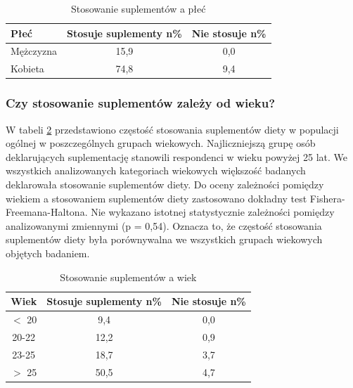 \begin{table}[H]
    \centering
    \caption{Stosowanie suplementów a płeć}
    \label{tab:supl-plec}
    \begin{tabular}{|l|c|c|}
        \hline
        \textbf{Płeć} & \textbf{Stosuje suplementy n\%} & \textbf{Nie stosuje n\%} \\
        \hline
        \hline
        Mężczyzna & 15,9 & 0,0 \\
        \hline
        Kobieta & 74,8 & 9,4 \\
        \hline
    \end{tabular}
\end{table}


\subsubsection{Czy stosowanie suplementów zależy od wieku?}

%
%

W tabeli \ref{tab:supl-wiek} przedstawiono częstość stosowania suplementów diety w populacji ogólnej w poszczególnych grupach wiekowych. Najliczniejszą grupę osób deklarujących suplementację stanowili respondenci w wieku powyżej 25 lat. We wszystkich analizowanych kategoriach wiekowych większość badanych deklarowała stosowanie suplementów diety. Do oceny zależności pomiędzy wiekiem a stosowaniem suplementów diety zastosowano dokładny test Fishera-Freemana-Haltona. Nie wykazano istotnej statystycznie zależności pomiędzy analizowanymi zmiennymi (p = 0,54). Oznacza to, że częstość stosowania suplementów diety była porównywalna we wszystkich grupach wiekowych objętych badaniem.

\begin{table}[H]
    \centering
    \caption{Stosowanie suplementów a wiek}
    \label{tab:supl-wiek}
    \begin{tabular}{|c|c|c|}
        \hline
        \textbf{Wiek} & \textbf{Stosuje suplementy n\%} & \textbf{Nie stosuje n\%} \\
        \hline
        \hline
        $<$ 20 & 9,4 & 0,0 \\
        \hline
        20-22 & 12,2 & 0,9 \\
        \hline
        23-25 & 18,7 & 3,7 \\
        \hline
        $>$ 25 & 50,5 & 4,7 \\
        \hline
    \end{tabular}
\end{table}


